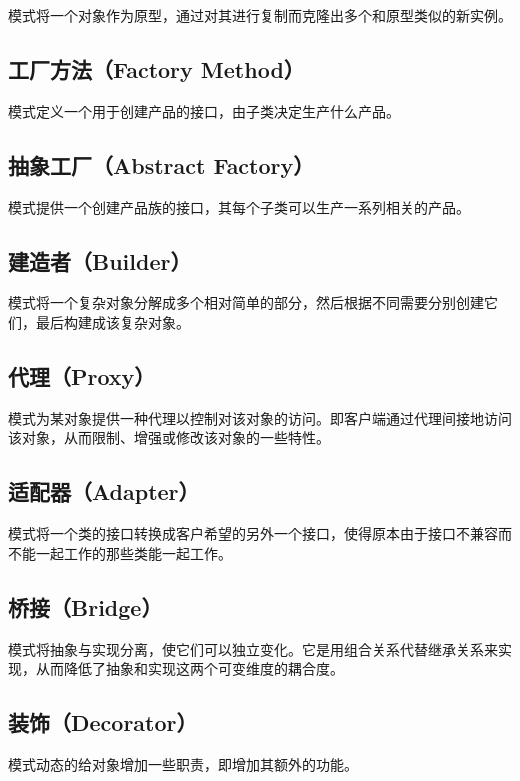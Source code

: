 \documentclass[cn,black,12pt,normal]{elegantnote}
\begin{document}
模式将一个对象作为原型，通过对其进行复制而克隆出多个和原型类似的新实例。

\subsection{工厂方法（Factory Method）}

模式定义一个用于创建产品的接口，由子类决定生产什么产品。

\subsection{抽象工厂（Abstract Factory）}

模式提供一个创建产品族的接口，其每个子类可以生产一系列相关的产品。

\subsection{建造者（Builder）}

模式将一个复杂对象分解成多个相对简单的部分，然后根据不同需要分别创建它们，最后构建成该复杂对象。

\subsection{代理（Proxy）}

模式为某对象提供一种代理以控制对该对象的访问。即客户端通过代理间接地访问该对象，从而限制、增强或修改该对象的一些特性。

\subsection{适配器（Adapter）}

模式将一个类的接口转换成客户希望的另外一个接口，使得原本由于接口不兼容而不能一起工作的那些类能一起工作。

\subsection{桥接（Bridge）}

模式将抽象与实现分离，使它们可以独立变化。它是用组合关系代替继承关系来实现，从而降低了抽象和实现这两个可变维度的耦合度。

\subsection{装饰（Decorator）}

模式动态的给对象增加一些职责，即增加其额外的功能。
\end{document}
